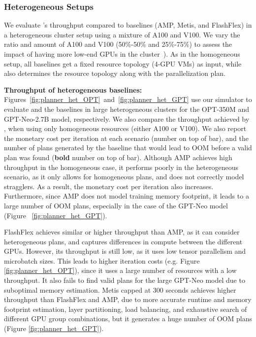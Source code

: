 \subsubsection{Heterogeneous Setups}\label{sec:eval_planner_het}

We evaluate \sailor's throughput compared to baselines (AMP, Metis, and FlashFlex) in a heterogeneous cluster setup using a mixture of A100 and V100. We vary the ratio and amount of A100 and V100 (50\%-50\% and 25\%-75\%) to assess the impact of having more low-end GPUs in the cluster~\cite{guo2024cephalo}). As in the homogeneous setup, all baselines get a fixed resource topology (4-GPU VMs) as input, while \sailor also determines the resource topology along with the parallelization plan.

\textbf{Throughput of heterogeneous baselines:} Figures~\ref{fig:planner_het_OPT}~and~\ref{fig:planner_het_GPT} use our simulator to evaluate \sailor and the baselines in large heterogeneous clusters for the OPT-350M and GPT-Neo-2.7B model, respectively. We also compare the throughput achieved by \sailor, when using only homogeneous resources (either A100 or V100).  We also report the monetary cost per iteration at each scenario (number on top of bar), and the number of plans generated by the baseline that would lead to OOM before a valid plan was found (\textbf{bold} number on top of bar). Although AMP achieves high throughput in the homogeneous case,  it performs poorly in the heterogeneous scenario, as it only allows for homogeneous plans, and does not correctly model stragglers. As a result, the monetary cost per iteration also increases. Furthermore, since AMP does not model training memory footprint, it leads to a large number of OOM plans, especially in the case of the GPT-Neo model (Figure ~\ref{fig:planner_het_GPT}). 

FlashFlex achieves similar or higher throughput than AMP, as it can consider heterogeneous plans, and captures differences in compute between the different GPUs. However, its throughput is still low, as it uses low tensor parallelism and microbatch sizes. This leads to higher iteration costs (e.g. Figure \ref{fig:planner_het_OPT}), since it uses a large number of resources with a low throughput. It also fails to find valid plans for the large GPT-Neo model due to suboptimal memory estimation. Metis capped at 300 seconds achieves higher throughput than FlashFlex and AMP, due to more accurate runtime and memory footprint estimation, layer partitioning, load balancing, and exhaustive search of different GPU group combinations, but it generates a huge number of OOM plans (Figure \ref{fig:planner_het_GPT}).

